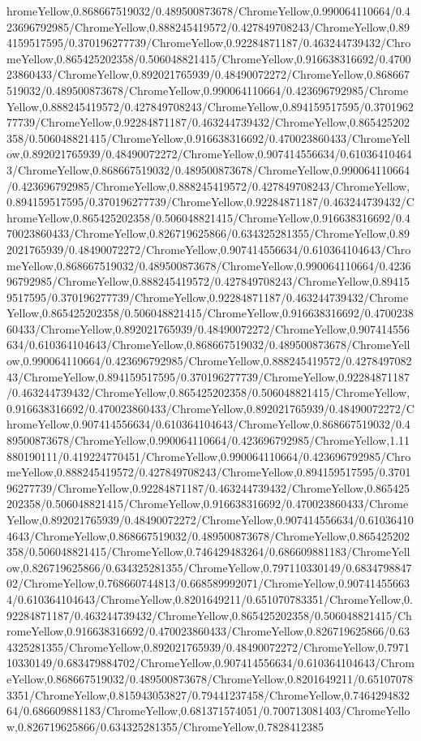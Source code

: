 {\begin{tikzternal}
{hromeYellow,0.868667519032/0.489500873678/ChromeYellow,0.990064110664/0.423696792985/ChromeYellow,0.888245419572/0.427849708243/ChromeYellow,0.894159517595/0.370196277739/ChromeYellow,0.92284871187/0.463244739432/ChromeYellow,0.865425202358/0.506048821415/ChromeYellow,0.916638316692/0.470023860433/ChromeYellow,0.892021765939/0.48490072272/ChromeYellow,0.868667519032/0.489500873678/ChromeYellow,0.990064110664/0.423696792985/ChromeYellow,0.888245419572/0.427849708243/ChromeYellow,0.894159517595/0.370196277739/ChromeYellow,0.92284871187/0.463244739432/ChromeYellow,0.865425202358/0.506048821415/ChromeYellow,0.916638316692/0.470023860433/ChromeYellow,0.892021765939/0.48490072272/ChromeYellow,0.907414556634/0.610364104643/ChromeYellow,0.868667519032/0.489500873678/ChromeYellow,0.990064110664/0.423696792985/ChromeYellow,0.888245419572/0.427849708243/ChromeYellow,0.894159517595/0.370196277739/ChromeYellow,0.92284871187/0.463244739432/ChromeYellow,0.865425202358/0.506048821415/ChromeYellow,0.916638316692/0.470023860433/ChromeYellow,0.826719625866/0.634325281355/ChromeYellow,0.892021765939/0.48490072272/ChromeYellow,0.907414556634/0.610364104643/ChromeYellow,0.868667519032/0.489500873678/ChromeYellow,0.990064110664/0.423696792985/ChromeYellow,0.888245419572/0.427849708243/ChromeYellow,0.894159517595/0.370196277739/ChromeYellow,0.92284871187/0.463244739432/ChromeYellow,0.865425202358/0.506048821415/ChromeYellow,0.916638316692/0.470023860433/ChromeYellow,0.892021765939/0.48490072272/ChromeYellow,0.907414556634/0.610364104643/ChromeYellow,0.868667519032/0.489500873678/ChromeYellow,0.990064110664/0.423696792985/ChromeYellow,0.888245419572/0.427849708243/ChromeYellow,0.894159517595/0.370196277739/ChromeYellow,0.92284871187/0.463244739432/ChromeYellow,0.865425202358/0.506048821415/ChromeYellow,0.916638316692/0.470023860433/ChromeYellow,0.892021765939/0.48490072272/ChromeYellow,0.907414556634/0.610364104643/ChromeYellow,0.868667519032/0.489500873678/ChromeYellow,0.990064110664/0.423696792985/ChromeYellow,1.11880190111/0.419224770451/ChromeYellow,0.990064110664/0.423696792985/ChromeYellow,0.888245419572/0.427849708243/ChromeYellow,0.894159517595/0.370196277739/ChromeYellow,0.92284871187/0.463244739432/ChromeYellow,0.865425202358/0.506048821415/ChromeYellow,0.916638316692/0.470023860433/ChromeYellow,0.892021765939/0.48490072272/ChromeYellow,0.907414556634/0.610364104643/ChromeYellow,0.868667519032/0.489500873678/ChromeYellow,0.865425202358/0.506048821415/ChromeYellow,0.746429483264/0.686609881183/ChromeYellow,0.826719625866/0.634325281355/ChromeYellow,0.797110330149/0.683479884702/ChromeYellow,0.768660744813/0.668589992071/ChromeYellow,0.907414556634/0.610364104643/ChromeYellow,0.8201649211/0.651070783351/ChromeYellow,0.92284871187/0.463244739432/ChromeYellow,0.865425202358/0.506048821415/ChromeYellow,0.916638316692/0.470023860433/ChromeYellow,0.826719625866/0.634325281355/ChromeYellow,0.892021765939/0.48490072272/ChromeYellow,0.797110330149/0.683479884702/ChromeYellow,0.907414556634/0.610364104643/ChromeYellow,0.868667519032/0.489500873678/ChromeYellow,0.8201649211/0.651070783351/ChromeYellow,0.815943053827/0.79441237458/ChromeYellow,0.746429483264/0.686609881183/ChromeYellow,0.681371574051/0.700713081403/ChromeYellow,0.826719625866/0.634325281355/ChromeYellow,0.7828412385}
\end{tikzternal}}
